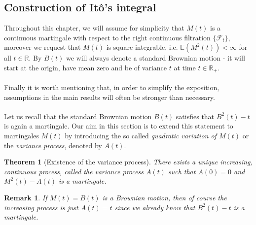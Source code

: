 \documentclass[11pt,a4paper, final]{article}
\newtheorem{thm}{Theorem}[section]
\newtheorem{rem}{Remark}[defn]
\begin{document}
\subsection{Construction of Itô's integral}
Throughout this chapter, we will assume for simplicity that $M(t)$ is a continuous martingale with respect to the right continuous filtration $\lbrace \mathcal{F}_t \rbrace$, moreover we request that $M(t)$ is square integrable, i.e. $\mathbb{E}(M^2(t)) < \infty$ for all $t \in \mathbb{R}$. By $B(t)$ we will always denote a standard Brownian motion - it will start at the origin, have mean zero and be of variance $t$ at time $t \in \mathbb{R}_+$. 
\\\\
 Finally it is worth mentioning that, in order to simplify the exposition, assumptions in the main results will often be stronger than necessary. 
\\
\\ 
Let us recall that the standard Brownian motion $B(t)$ satisfies that $B^2(t)-t$ is again a martingale. 
Our aim in this section is to extend this statement to martingales $M(t)$ by introducing the so called \textit{quadratic variation of $M(t)$} or the \textit{variance process}, denoted by $A(t)$.
\begin{thm}[Existence of the variance process] \label{variancethm}
There exists a unique increasing, continuous process, called the variance process $A(t)$ such that $A(0)=0$ and $M^2(t)-A(t)$ is a martingale.
\end{thm}
\begin{rem} \label{varianceprocessofBM} If $M(t)=B(t)$ is a Brownian motion, then of course the increasing process is just $A(t)=t$ since we already know that $B^2(t)-t$ is a martingale. 
\end{rem}
\end{document}
